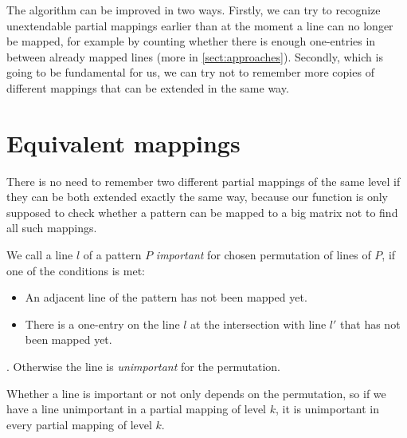 The algorithm can be improved in two ways. Firstly, we can try to recognize unextendable partial mappings earlier than at the moment a line can no longer be mapped, for example by counting whether there is enough one-entries in between already mapped lines (more in \autoref{sect:approaches}). Secondly, which is going to be fundamental for us, we can try not to remember more copies of different mappings that can be extended in the same way.

\section{Equivalent mappings}
There is no need to remember two different partial mappings of the same level if they can be both extended exactly the same way, because our function is only supposed to check whether a pattern can be mapped to a big matrix not to find all such mappings.
\begin{defn}
We call a line $l$ of a pattern $P$ \emph{important} for chosen permutation of lines of $P$, if one of the conditions is met:
\begin{itemize}
\item An adjacent line of the pattern has not been mapped yet.
\item There is a one-entry on the line $l$ at the intersection with line $l'$ that has not been mapped yet.
\end{itemize}.
Otherwise the line is \emph{unimportant} for the permutation.
\end{defn}
Whether a line is important or not only depends on the permutation, so if we have a line unimportant in a partial mapping of level $k$, it is unimportant in every partial mapping of level $k$.


